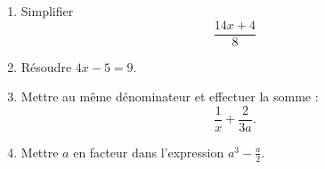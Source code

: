 
\begin{exercice}\label{exosmath-0028}

    \begin{multicols}{2}
        \begin{enumerate}
            \item
                Simplifier
                \begin{equation}
                    \frac{ 14x+4 }{ 8 }
                \end{equation}
            \item
                Résoudre \( 4x-5=9\).
            \item
                Mettre au même dénominateur et effectuer la somme :
                \begin{equation}
                    \frac{1}{ x }+\frac{ 2 }{ 3a }.
                \end{equation}
            \item
                Mettre \( a\) en facteur dans l'expression \( a^3-\frac{ a }{2}\).
        \end{enumerate}
    \end{multicols}

\end{exercice}
